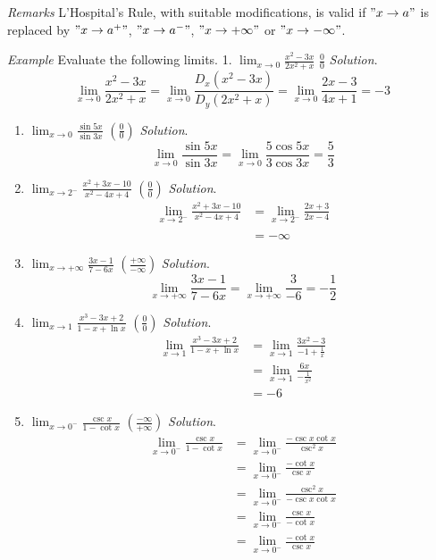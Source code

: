 \documentclass[
  letterpaper,
  DIV=11,
  numbers=noendperiod]{scrartcl}
\theoremstyle{definition}
\theoremstyle{plain}
\theoremstyle{remark}
\begin{document}
\leavevmode{}%
\emph{Remarks} L'Hospital's Rule, with suitable modifications, is valid
if \("x \to a"\) is replaced by \("x \to a^+"\), \("x \to a^-"\),
\("x \to +\infty"\) or \("x \to -\infty"\).

\leavevmode{}%
\emph{Example} Evaluate the following limits. 1.
\(\displaystyle\lim_{x \to 0} \frac{x^2-3x}{2x^2+x}\) \(\frac{0}{0}\)
\emph{Solution}. \[
\displaystyle\lim_{x \to 0} \frac{x^2-3x}{2x^2+x}=\displaystyle\lim_{x \to 0} \frac{D_x\left(x^2-3x\right)}{D_y\left(2x^2+x\right)}=\displaystyle\lim_{x \to 0} \frac{2x-3}{4x+1}=-3
\]

\begin{enumerate}
\def\labelenumi{\arabic{enumi}.}
\setcounter{enumi}{1}
\item
  \(\displaystyle\lim_{x \to 0} \frac{\sin5x}{\sin3x}\)
  \(\left(\frac{0}{0}\right)\) \emph{Solution}. \[
  \displaystyle\lim_{x \to 0} \frac{\sin5x}{\sin3x}=\displaystyle\lim_{x \to 0} \frac{5\cos5x}{3\cos3x}=\frac{5}{3}
  \]
\item
  \(\displaystyle\lim_{x \to 2^-} \frac{x^2+3x-10}{x^2-4x+4}\)
  \(\left(\frac{0}{0}\right)\) \emph{Solution}. \[
  \begin{aligned}
  \displaystyle\lim_{x \to 2^-} \frac{x^2+3x-10}{x^2-4x+4}&=\displaystyle\lim_{x \to 2^-}\frac{2x+3}{2x-4}\\&\\&=-\infty
  \end{aligned}
  \]
\item
  \(\displaystyle\lim_{x \to +\infty}\frac{3x-1}{7-6x}\)
  \(\left(\frac{+\infty}{-\infty}\right)\) \emph{Solution}. \[
  \displaystyle\lim_{x \to +\infty}\frac{3x-1}{7-6x}=\displaystyle\lim_{x \to +\infty} \frac{3}{-6}=-\frac{1}{2}
  \]
\item
  \(\displaystyle\lim_{x \to 1} \frac{x^3-3x+2}{1-x+\ln x}\)
  \(\left(\frac{0}{0}\right)\) \emph{Solution}. \[
  \begin{aligned}
  \displaystyle\lim_{x \to 1} \frac{x^3-3x+2}{1-x+\ln x}&=\displaystyle\lim_{x \to 1}\frac{3x^2-3}{-1+\frac{1}{x}}\\&=\displaystyle\lim_{x \to 1}\frac{6x}{-\frac{1}{x^2}}\\&=-6
  \end{aligned}
  \]
\item
  \(\displaystyle\lim_{x \to 0^-}\frac{\csc x}{1-\cot x}\)
  \(\left(\frac{-\infty}{+\infty}\right)\) \emph{Solution}. \[
  \begin{aligned}
  \displaystyle\lim_{x \to 0^-}\frac{\csc x}{1-\cot x}&=\displaystyle\lim_{x \to 0^-}\frac{-\csc x \cot x}{\csc^2 x}\\&=\displaystyle\lim_{x \to 0^-}\frac{-\cot x}{\csc x}\\&=\displaystyle\lim_{x \to 0^-} \frac{\csc^2 x}{-\csc x \cot x}\\&=\displaystyle\lim_{x \to 0^-}\frac{\csc x}{-\cot x}\\&=\displaystyle\lim_{x \to 0^-}\frac{-\cot x}{\csc x}
  \end{aligned}
  \]
\end{enumerate}
\end{document}
